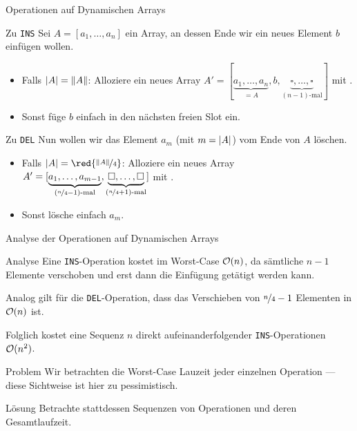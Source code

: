 \begin{frame}{Operationen auf Dynamischen Arrays}
\begin{block}{Zu \texttt{INS}}
Sei $A = [ a_1, \dots, a_n ]$ ein Array, an dessen Ende wir ein neues Element $b$ \alert{einf\"ugen} wollen.
\begin{itemize}
    \item Falls $\vert A\vert = \lVert A\rVert$: Alloziere ein neues Array $A' = [ \underbrace{a_1, \dots, a_n}_{=A}, b, \underbrace{\square, \dots, \square}_{(n-1)\text{-mal}} ]$ mit .
    \item Sonst f\"uge $b$ einfach in den n\"achsten freien Slot ein.
\end{itemize}
\end{block}

\begin{block}{Zu \texttt{DEL}}
Nun wollen wir das Element $a_m$ (mit $m = \vert A\vert$) vom Ende von $A$ \alert{l\"oschen}.
\begin{itemize}
    \item Falls $\abs{A} = \red{\nicefrac{\norm{A}}{4}}$: Alloziere ein neues Array $A' = [ \underbrace{a_1, \dots, a_{m-1}}_{(\nicefrac{n}{4} - 1)\text{-mal}}, \underbrace{\square, \dots, \square}_{(\nicefrac{n}{4} + 1)\text{-mal}} ]$ mit .
    \item Sonst l\"osche einfach $a_m$.
\end{itemize}
\end{block}
\end{frame}

\begin{frame}{Analyse der Operationen auf Dynamischen Arrays}
\begin{block}{Analyse}
Eine \texttt{INS}-Operation kostet im Worst-Case $\mathcal{O}(n)$, da s\"amtliche $n-1$ Elemente verschoben und erst dann die Einf\"ugung get\"atigt werden kann.

Analog gilt f\"ur die \texttt{DEL}-Operation, dass das Verschieben von $\nicefrac{n}{4}-1$ Elementen in $\mathcal{O}(n)$ ist.
\end{block}

\begin{remark}
Folglich kostet eine Sequenz $n$ direkt aufeinanderfolgender \texttt{INS}-Operationen $\mathcal{O}(n^2)$.
\end{remark}

\begin{block}{Problem}
Wir betrachten die Worst-Case Lauzeit \alert{jeder einzelnen Operation} --- diese Sichtweise ist hier \alert{zu pessimistisch}.
\end{block}

\begin{block}{L\"osung}
Betrachte stattdessen \alert{Sequenzen von Operationen} und deren Gesamtlaufzeit.
\end{block}
\end{frame}

